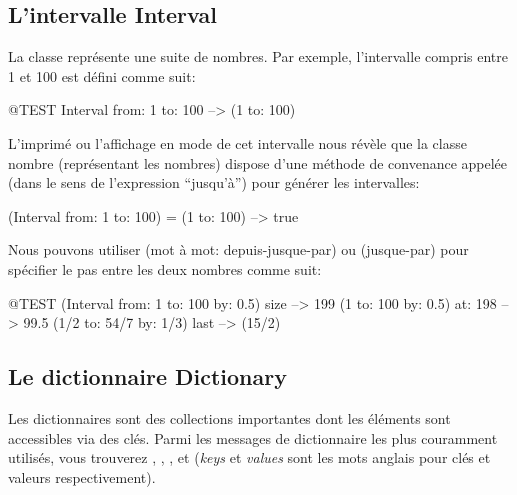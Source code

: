 \documentclass[a4paper,10pt,twoside]{book}
\begin{document}

\subsection{L'intervalle Interval}
La classe  repr\'esente une suite de nombres.
Par exemple, l'intervalle compris entre 1 et 100 est d\'efini comme
suit:
\begin{code}{@TEST}
Interval from: 1 to: 100 --> (1 to: 100)
\end{code}

\noindent
L'imprim\'e ou l'affichage en mode  de
cet intervalle nous r\'ev\`ele que la classe nombre  (repr\'esentant les nombres) dispose d'une m\'ethode de convenance appel\'ee  (dans le sens de l'expression ``jusqu'\`a'') pour g\'en\'erer les intervalles:

\begin{code}{}
(Interval from: 1 to: 100) = (1 to: 100) --> true
\end{code}

Nous pouvons utiliser  (mot \`a mot: depuis-jusque-par) ou
 (jusque-par) pour sp\'ecifier le pas entre les deux nombres comme suit:

\begin{code}{@TEST}
(Interval from: 1 to: 100 by: 0.5) size --> 199
(1 to: 100 by: 0.5) at: 198 --> 99.5
(1/2 to: 54/7 by: 1/3) last --> (15/2)
\end{code}

\subsection{Le dictionnaire Dictionary}
Les dictionnaires sont des collections importantes dont les \'el\'ements
sont accessibles via des cl\'es.
Parmi les messages de dictionnaire les plus couramment utilis\'es, vous trouverez  
, , ,  et  (\emph{keys} et \emph{values} sont les mots anglais pour cl\'es et valeurs respectivement).
\end{document}
